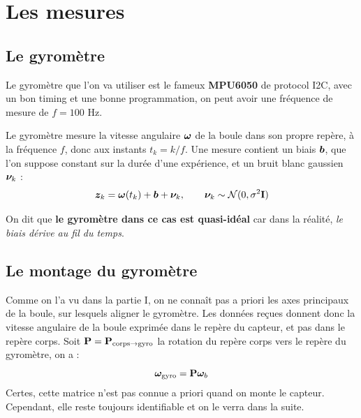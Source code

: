 
\section{Les mesures}

\subsection{Le gyromètre}

Le gyromètre que l'on va utiliser est le fameux \textbf{MPU6050} de protocol I2C, 
avec un bon timing et une bonne programmation, on peut avoir une fréquence de mesure de $ f=100 $ Hz.

Le gyromètre mesure la vitesse angulaire $\bm{\omega}$ de la boule
dans son propre repère, à la fréquence $f$, donc aux instants
$t_k = k/f$. Une mesure contient un
biais $\bm{b}$, que l'on suppose constant sur la durée d'une
expérience, et un bruit blanc gaussien $\bm{\nu}_k$ :
\[
    \bm{z}_k = \bm{\omega}(t_k) + \bm{b} + \bm{\nu}_k,
    \qquad
    \bm{\nu}_k \sim \mathcal{N}(0, \sigma^2\mathbf{I})
\]

\begin{remarque}
    On dit que \textbf{le gyromètre dans ce cas est quasi-idéal} car dans la réalité, \emph{le biais dérive au fil du temps}.
\end{remarque}
\subsection{Le montage du gyromètre}
Comme on l'a vu dans la partie I, on ne connaît pas a priori les axes principaux de la boule, sur lesquels aligner le gyromètre. Les données
reçues donnent donc la vitesse angulaire de la boule exprimée dans le repère du capteur, et pas dans le repère corps. Soit
$\mathbf{P} = \mathbf{P}_{\text{corps}\to\text{gyro}}$ la rotation du repère corps vers le repère du gyromètre, on a :
\[
    \bm{\omega}_{\text{gyro}} = \mathbf{P}\bm{\omega}_b
\]
Certes, cette matrice n'est pas connue a priori quand on monte le capteur. Cependant, elle reste toujours identifiable et on le verra dans la suite.

